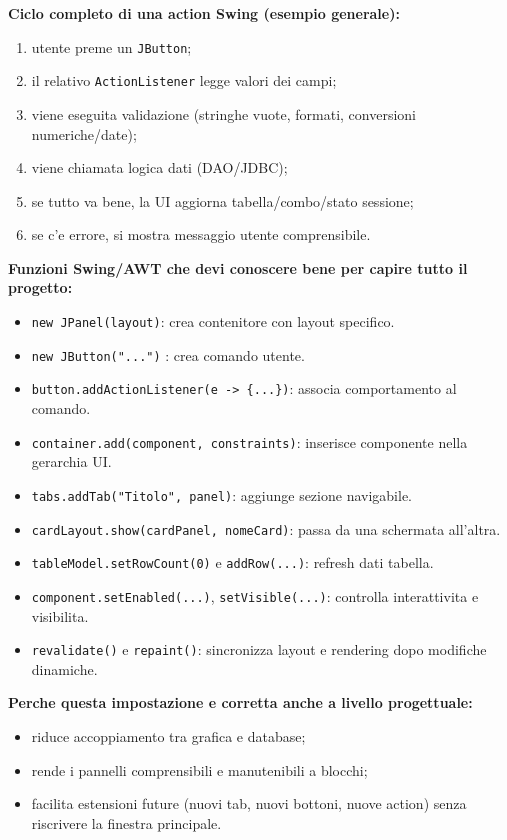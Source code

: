 \documentclass[12pt,a4paper]{article}
\begin{document}
\textbf{Ciclo completo di una action Swing (esempio generale):}
\begin{enumerate}
  \item utente preme un \texttt{JButton};
  \item il relativo \texttt{ActionListener} legge valori dei campi;
  \item viene eseguita validazione (stringhe vuote, formati, conversioni numeriche/date);
  \item viene chiamata logica dati (DAO/JDBC);
  \item se tutto va bene, la UI aggiorna tabella/combo/stato sessione;
  \item se c'e errore, si mostra messaggio utente comprensibile.
\end{enumerate}

\textbf{Funzioni Swing/AWT che devi conoscere bene per capire tutto il progetto:}
\begin{itemize}
  \item \texttt{new JPanel(layout)}: crea contenitore con layout specifico.
  \item \texttt{new JButton("...")} : crea comando utente.
  \item \texttt{button.addActionListener(e -> \{...\})}: associa comportamento al comando.
  \item \texttt{container.add(component, constraints)}: inserisce componente nella gerarchia UI.
  \item \texttt{tabs.addTab("Titolo", panel)}: aggiunge sezione navigabile.
  \item \texttt{cardLayout.show(cardPanel, nomeCard)}: passa da una schermata all'altra.
  \item \texttt{tableModel.setRowCount(0)} e \texttt{addRow(...)}: refresh dati tabella.
  \item \texttt{component.setEnabled(...)}, \texttt{setVisible(...)}: controlla interattivita e visibilita.
  \item \texttt{revalidate()} e \texttt{repaint()}: sincronizza layout e rendering dopo modifiche dinamiche.
\end{itemize}

\textbf{Perche questa impostazione e corretta anche a livello progettuale:}
\begin{itemize}
  \item riduce accoppiamento tra grafica e database;
  \item rende i pannelli comprensibili e manutenibili a blocchi;
  \item facilita estensioni future (nuovi tab, nuovi bottoni, nuove action) senza riscrivere la finestra principale.
\end{itemize}
\end{document}
